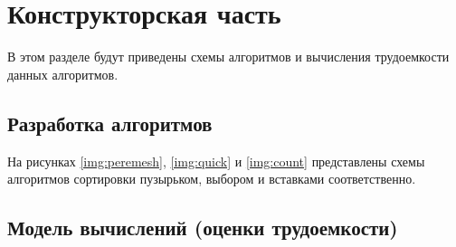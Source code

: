 \chapter{Конструкторская часть}
В этом разделе будут приведены схемы алгоритмов и вычисления трудоемкости данных алгоритмов.





\section{Разработка алгоритмов}

На рисунках  \ref{img:peremesh}, \ref{img:quick} и \ref{img:count} представлены схемы алгоритмов сортировки пузырьком, выбором и вставками соответственно.



\section{Модель вычислений (оценки трудоемкости)}

